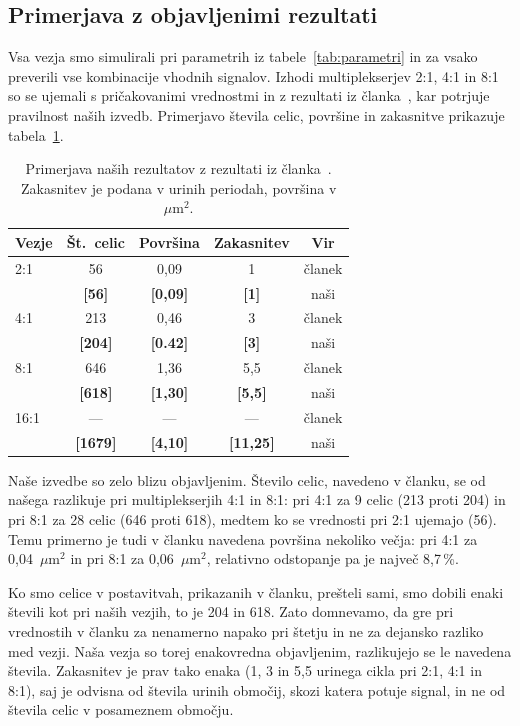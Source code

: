 \documentclass[graybox, envcountchap]{svmult}
\begin{document}
\subsection{Primerjava z objavljenimi rezultati}
\label{g25:sec:primerjava}

Vsa vezja smo simulirali pri parametrih iz tabele~\ref{tab:parametri} in za vsako preverili vse kombinacije vhodnih signalov. Izhodi multiplekserjev 2:1, 4:1 in 8:1 so se ujemali s pričakovanimi vrednostmi in z rezultati iz članka~\cite{alharbi2024}, kar potrjuje pravilnost naših izvedb. Primerjavo števila celic, površine in zakasnitve prikazuje tabela~\ref{g25:tab:primerjava}.

\begin{table}[H]
\centering
\begin{tabular}{lcccc}
\toprule
Vezje & Št.~celic & Površina & Zakasnitev & Vir \\
\midrule
2:1  & 56 & 0,09 & 1 & članek \\
     & \textbf{[56]} & \textbf{[0,09]} & \textbf{[1]} & naši \\
4:1  & 213 & 0,46 & 3 & članek \\
     & \textbf{[204]} & \textbf{[0.42]} & \textbf{[3]} & naši \\
8:1  & 646 & 1,36 & 5,5 & članek \\
     & \textbf{[618]} & \textbf{[1,30]} & \textbf{[5,5]} & naši \\
16:1 & --- & --- & --- & članek \\
     & \textbf{[1679]} & \textbf{[4,10]} & \textbf{[11,25]} & naši \\
\bottomrule
\end{tabular}
\caption{Primerjava naših rezultatov z rezultati iz članka~\cite{alharbi2024}. Zakasnitev je podana v urinih periodah, površina v $\mu\mathrm{m}^2$.}
\label{g25:tab:primerjava}
\end{table}

Naše izvedbe so zelo blizu objavljenim. Število celic, navedeno v članku, se od našega razlikuje pri multiplekserjih 4:1 in 8:1: pri 4:1 za 9 celic (213 proti 204) in pri 8:1 za 28 celic (646 proti 618), medtem ko se vrednosti pri 2:1 ujemajo (56). Temu primerno je tudi v članku navedena površina nekoliko večja: pri 4:1 za 0,04~$\mu\mathrm{m}^2$ in pri 8:1 za 0,06~$\mu\mathrm{m}^2$, relativno odstopanje pa je največ 8,7\,\%.

Ko smo celice v postavitvah, prikazanih v članku, prešteli sami, smo dobili enaki števili kot pri naših vezjih, to je 204 in 618. Zato domnevamo, da gre pri vrednostih v članku za nenamerno napako pri štetju in ne za dejansko razliko med vezji. Naša vezja so torej enakovredna objavljenim, razlikujejo se le navedena števila. Zakasnitev je prav tako enaka (1, 3 in 5,5 urinega cikla pri 2:1, 4:1 in 8:1), saj je odvisna od števila urinih območij, skozi katera potuje signal, in ne od števila celic v posameznem območju.
\end{document}
